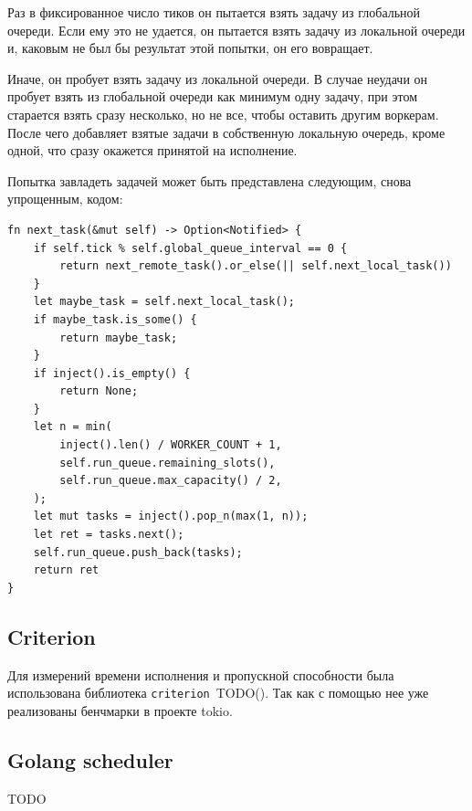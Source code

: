 Раз в фиксированное число тиков он пытается взять задачу из глобальной очереди. Если ему это не удается, он пытается взять задачу из локальной очереди и, каковым не был бы результат этой попытки, он его вовращает.

Иначе, он пробует взять задачу из локальной очереди. В случае неудачи он пробует взять из глобальной очереди как минимум одну задачу, при этом старается взять сразу несколько, но не все, чтобы оставить другим воркерам. После чего добавляет взятые задачи в собственную локальную очередь, кроме одной, что сразу окажется принятой на исполнение.

Попытка завладеть задачей может быть представлена следующим, снова упрощенным, кодом:

\begin{verbatim}
fn next_task(&mut self) -> Option<Notified> {
    if self.tick % self.global_queue_interval == 0 {
        return next_remote_task().or_else(|| self.next_local_task())
    }
    let maybe_task = self.next_local_task();
    if maybe_task.is_some() {
        return maybe_task;
    }
    if inject().is_empty() {
        return None;
    }
    let n = min(
        inject().len() / WORKER_COUNT + 1,
        self.run_queue.remaining_slots(),
        self.run_queue.max_capacity() / 2,
    );
    let mut tasks = inject().pop_n(max(1, n));
    let ret = tasks.next();
    self.run_queue.push_back(tasks);
    return ret
}
\end{verbatim}

\subsection{Criterion}

Для измерений времени исполнения и пропускной способности была использована библиотека \verb|criterion|~TODO(). Так как с помощью нее уже реализованы бенчмарки в проекте tokio.

\subsection{Golang scheduler}

TODO

